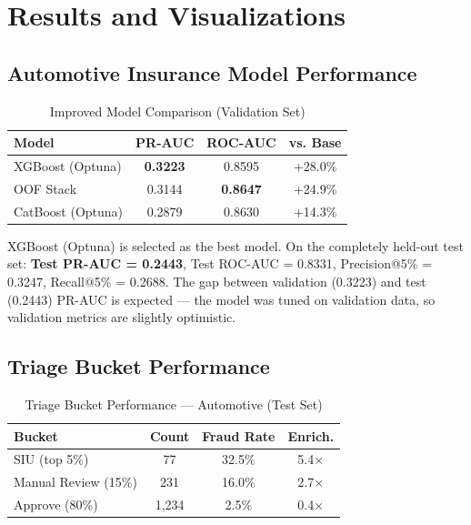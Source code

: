 \documentclass[10pt,twocolumn]{article}
\begin{document}
\section{Results and Visualizations}

\subsection{Automotive Insurance Model Performance}

\begin{table}[h]
\centering
\caption{Improved Model Comparison (Validation Set)}
\small
\begin{tabular}{lccc}
\toprule
\textbf{Model} & \textbf{PR-AUC} & \textbf{ROC-AUC} & \textbf{vs. Base} \\
\midrule
XGBoost (Optuna)     & \textbf{0.3223} & 0.8595 & +28.0\% \\
OOF Stack            & 0.3144          & \textbf{0.8647} & +24.9\% \\
CatBoost (Optuna)    & 0.2879          & 0.8630 & +14.3\% \\
\bottomrule
\end{tabular}
\end{table}

XGBoost (Optuna) is selected as the best model. On the completely held-out test set: \textbf{Test PR-AUC = 0.2443}, Test ROC-AUC = 0.8331, Precision@5\% = 0.3247, Recall@5\% = 0.2688. The gap between validation (0.3223) and test (0.2443) PR-AUC is expected --- the model was tuned on validation data, so validation metrics are slightly optimistic.

\subsection{Triage Bucket Performance}

\begin{table}[h]
\centering
\caption{Triage Bucket Performance --- Automotive (Test Set)}
\small
\begin{tabular}{lccc}
\toprule
\textbf{Bucket} & \textbf{Count} & \textbf{Fraud Rate} & \textbf{Enrich.} \\
\midrule
SIU (top 5\%)        & 77    & 32.5\% & 5.4$\times$ \\
Manual Review (15\%) & 231   & 16.0\% & 2.7$\times$ \\
Approve (80\%)       & 1,234 & 2.5\%  & 0.4$\times$ \\
\bottomrule
\end{tabular}
\end{table}
\end{document}
